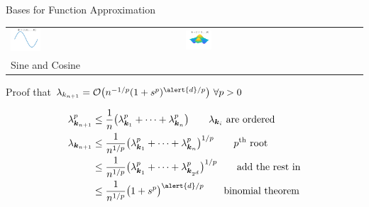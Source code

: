 \documentclass[10pt,compress,xcolor={usenames,dvipsnames},aspectratio=169]{beamer}
\begin{document}
\begin{frame}{Bases for Function Approximation}
\begin{tabular}{>{\centering}m{}>{\centering}m{}>{\centering}m{}>{\centering}m{}>{\centering}m{}}
\includegraphics[width =0.18\textwidth]{ProgramsImages/CosineSine_Degree_1_k.png}  &
\includegraphics[width =0.18\textwidth]{ProgramsImages/CosineSine_Degree_1_1_k.png}   
\tabularnewline[-7ex]
Sine and Cosine \tabularnewline
	\end{tabular}
\end{frame}



\begin{frame}{Proof that $\lambda_{k_{n+1}} = \Order\bigl(n^{-1/p}(1 + s^p)^{\alert{d}/p}\bigr) \ \forall p > 0$}

\begin{align*}
    \lambda_{\vk_{n+1}}^p &\le \frac 1n \bigl( \lambda_{\vk_{1}}^p + \cdots + \lambda_{\vk_{n}}^p \bigr) \qquad \lambda_{\vk_{i}} \text{ are ordered} \\
    \lambda_{\vk_{n+1}} &\le \frac 1{n^{1/p}} \bigl( \lambda_{\vk_{1}}^p + \cdots + \lambda_{\vk_{n}}^p \bigr)^{1/p} \qquad p^{\text{th}} \text{ root} \\
     &\le \frac 1{n^{1/p}} \bigl( \lambda_{\vk_{1}}^p + \cdots + \lambda_{\vk_{2^d}}^p \bigr)^{1/p} \qquad  \text{add the rest in} \\
     &\le \frac 1{n^{1/p}} \bigl( 1 + s^p \bigr)^{\alert{d}/p} \qquad  \text{binomial theorem} 
\end{align*}
    
\end{frame}

\end{document}
